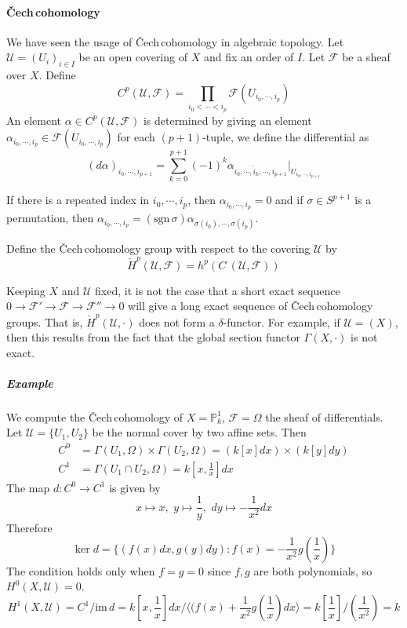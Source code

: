 \documentclass[12pt]{article}
\theoremstyle{plain}
\theoremstyle{definition}
\newcommand{\sU}{\mathcal{U}}
\newcommand{\IP}{\mathbb{P}}
\newcommand{\shF}{\mathscr{F}}
\newcommand{\<}{\langle}
\renewcommand{\>}{\rangle}
\def\what{\widehat}
\newcommand{\Ohm}{\Omega}
\newcommand{\Cech}{\v{C}ech\,}
\newcommand{\im}{\mathrm{im}\,}
\begin{document}
\paragraph{\Cech cohomology}
We have seen the usage of \Cech cohomology in algebraic topology. Let $\sU = (U_i)_{i \in I}$ be an open covering of $X$ and fix an order of $I$. Let $\shF$ be a sheaf over $X$. Define 
$$ C^p(\sU, \shF) = \prod_{i_0 < \cdots < i_p} \shF(U_{i_0, \cdots, i_p}) $$
An element $\alpha \in C^p(\sU, \shF)$ is determined by giving an element $\alpha_{i_0, \cdots, i_p} \in \shF(U_{i_0, \cdots, i_p})$ for each $(p + 1)$-tuple, we define the differential as 
$$ (d\alpha)_{i_0, \cdots, i_{p+1}} = \sum_{k = 0}^{p + 1} (-1)^k \alpha_{i_0, \cdots, \what{i}_k, \cdots, i_{p+1}}|_{U_{i_0, \cdots, i_{p+1}}}$$

If there is a repeated index in $i_0, \cdots, i_p$, then $\alpha_{i_0, \cdots, i_p} = 0$ and if $\sigma \in S^{p+1}$ is a permutation, then $\alpha_{i_0, \cdots, i_p} = (\mathrm{sgn\,} \sigma) \alpha_{\sigma(i_0), \cdots, \sigma(i_p)}$.  

Define the \Cech cohomology group with respect to the covering $\sU$ by 
$$ \check{H}^p(\sU, \shF) = h^p(C^\cdot (\sU, \shF)) $$

Keeping $X$ and $\sU$ fixed, it is not the case that a short exact sequence 
$ 0 \to \shF' \to \shF \to \shF'' \to 0$ will give a long exact sequence of \Cech cohomology groups. That is, $\check{H}^p(\sU, \cdot)$ does not form a $\delta$-functor. For example, if $\sU = (X)$, then this results from the fact that the global section functor $\Gamma(X, \cdot)$ is not exact. 

\subparagraph{Example} We compute the \Cech cohomology of $X = \IP^1_k$, $\shF = \Ohm$ the sheaf of differentials. Let $\sU = \{ U_1, U_2 \}$ be the normal cover by two affine sets.  Then 
\begin{align*}
C^0 &= \Gamma(U_1, \Ohm) \times \Gamma(U_2, \Ohm) = (k[x] dx) \times (k[y] dy) \\
C^1 &= \Gamma(U_1 \cap U_2, \Ohm) = k[x, \frac{1}{x}] dx 
\end{align*} 
The map $d : C^0 \to C^1$ is given by 
$$ x \mapsto x, \, \, y \mapsto \frac{1}{y}, \, \, dy \mapsto - \frac{1}{x^2} dx $$
Therefore 
$$ \ker d = \{ (f(x) dx, g(y) dy) : f(x) = - \frac{1}{x^2} g(\frac{1}{x}) \}$$
The condition holds only when $f = g = 0$ since $f, g$ are both polynomials, so $H^0(X, \sU) = 0$. 
$$ H^1(X, \sU) = C^1/ \im d = k[x, \frac{1}{x}] dx/ \< (f(x) + \frac{1}{x^2} g(\frac{1}{x})dx \> = k[\frac{1}{x}]/(\frac{1}{x^2}) = k $$
\end{document}
